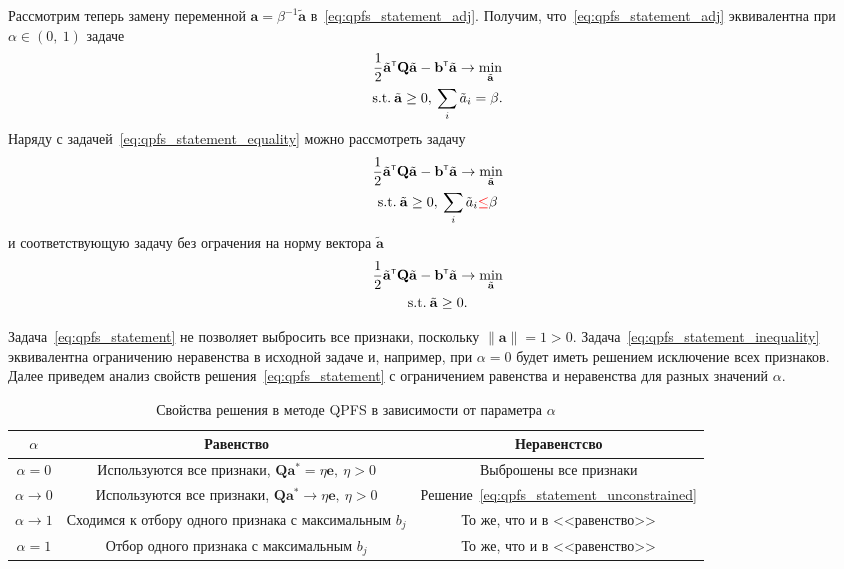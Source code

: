 \documentclass[12pt, a4paper]{article}
\newcommand{\T}{{\text{\tiny\sffamily\upshape\mdseries T}}}
\newcommand{\qmatr}{\mathbf{Q}}
\newcommand{\bvec}{\mathbf{b}}
\newcommand{\evec}{\mathbf{e}}
\newcommand{\avec}{\mathbf{a}}
\begin{document}
Рассмотрим теперь замену переменной $\avec = \beta^{-1} \tilde{\avec}$ в~\eqref{eq:qpfs_statement_adj}. Получим, что~\eqref{eq:qpfs_statement_adj} эквивалентна при $\alpha \in (0,\:1)$ задаче
\begin{gather}
\label{eq:qpfs_statement_equality}
\frac{1}{2} \tilde{\avec}^{\T} \qmatr \tilde{\avec} - \bvec^{\T} \tilde{\avec} \to \min_{\tilde{\avec}}\\
\text{s.t.}\: \tilde{\avec} \geq 0,\:\sum_i \tilde{a}_i = \beta.
\end{gather}
Наряду с задачей~\eqref{eq:qpfs_statement_equality} можно рассмотреть задачу
\begin{gather}
\label{eq:qpfs_statement_inequality}
\frac{1}{2} \tilde{\avec}^{\T} \qmatr \tilde{\avec} - \bvec^{\T} \tilde{\avec} \to \min_{\tilde{\avec}}\\
\text{s.t.}\: \tilde{\avec} \geq 0,\:\sum_i \tilde{a}_i \textcolor{red}{\leq} \beta
\end{gather}
и соответствующую задачу без ограчения на норму вектора $\tilde{\avec}$
\begin{gather}
\label{eq:qpfs_statement_unconstrained}
\frac{1}{2} \tilde{\avec}^{\T} \qmatr \tilde{\avec} - \bvec^{\T} \tilde{\avec} \to \min_{\tilde{\avec}}\\
\text{s.t.}\: \tilde{\avec} \geq 0.
\end{gather}

Задача~\eqref{eq:qpfs_statement} не позволяет выбросить все признаки, поскольку $\|\avec\| = 1 > 0$. Задача~\eqref{eq:qpfs_statement_inequality} эквивалентна ограничению неравенства в исходной задаче и, например, при $\alpha=0$ будет иметь решением исключение всех признаков. Далее приведем анализ свойств решения~\eqref{eq:qpfs_statement} с ограничением равенства и неравенства для разных значений $\alpha$.

\begin{table}[!htbp]
\caption{Свойства решения в методе QPFS в зависимости от параметра $\alpha$}
\label{tab:solution_properties}
\begin{tabular}{|c|c|c|}
\hline
$\alpha$ & Равенство & Неравенстсво\\
\hline
$\alpha=0$ & Используются все признаки, $\qmatr \avec^* = \eta \evec,\:\eta > 0$ & Выброшены все признаки \\
\hline
$\alpha \to 0$ &  Используются все признаки, $\qmatr \avec^* \to \eta \evec,\:\eta > 0$ & Решение~\eqref{eq:qpfs_statement_unconstrained} \\
\hline
$\alpha \to 1$ & Сходимся к отбору одного признака с максимальным $b_j$ & То же, что и в <<равенство>>\\
\hline
$\alpha = 1$ & Отбор одного признака с максимальным $b_j$ & То же, что и в <<равенство>>\\
\hline
\end{tabular}
\end{table}
\end{document}
